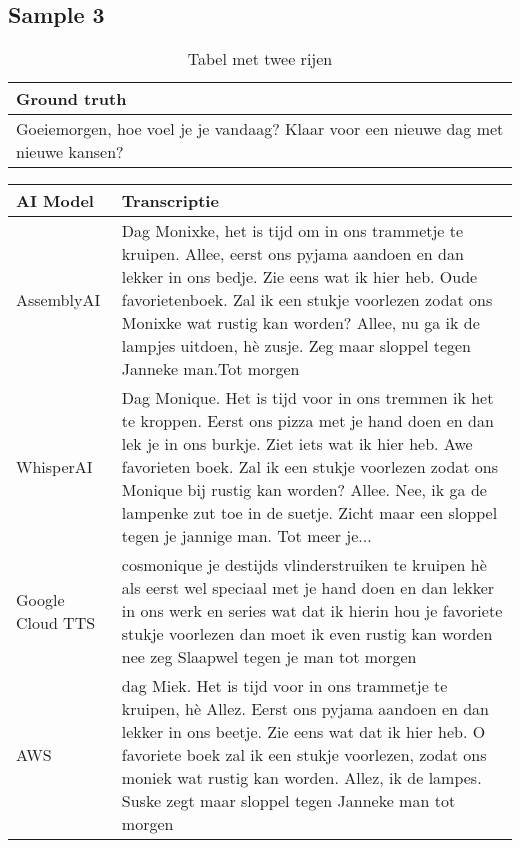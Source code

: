 \subsection{Sample 3}
\begin{table}[htbp]
    \centering
    \label{tab:groundtruth_sample3}
    \begin{tabularx}{\textwidth}{|X|}
        \hline
        \textbf{Ground truth} \\
        
        \hline
        Goeiemorgen, hoe voel je je vandaag? Klaar voor een nieuwe dag met nieuwe kansen? \\
        \hline
    \end{tabularx}
    \caption{Tabel met twee rijen}
\end{table}

\begin{table}[htbp]
    \centering
    \label{tab:results_sample3}
    \begin{tabularx}{\textwidth}{|l|X|}
    \hline
    \textbf{AI Model} & \textbf{Transcriptie} \\ \midrule
    
    AssemblyAI &    Dag Monixke, het is tijd om in ons trammetje te kruipen. Allee, eerst ons pyjama aandoen en dan lekker in ons bedje. Zie eens wat ik hier heb. Oude favorietenboek. Zal ik een stukje voorlezen zodat ons Monixke wat rustig kan worden? Allee, nu ga ik de lampjes uitdoen, hè zusje. Zeg maar sloppel tegen Janneke man.Tot morgen
    \\ \hline
    
    WhisperAI & Dag Monique. Het is tijd voor in ons tremmen ik het te kroppen. Eerst ons pizza met je hand doen en dan lek je in ons burkje. Ziet iets wat ik hier heb. Awe favorieten boek. Zal ik een stukje voorlezen zodat ons Monique bij rustig kan worden? Allee. Nee, ik ga de lampenke zut toe in de suetje. Zicht maar een sloppel tegen je jannige man. Tot meer je...
    \\ \hline
    
    Google Cloud TTS &         cosmonique je destijds vlinderstruiken te kruipen hè als eerst wel speciaal met je hand doen en dan lekker in ons werk en series wat dat ik hierin hou je favoriete stukje voorlezen dan moet ik even rustig kan worden nee zeg Slaapwel tegen je man tot morgen
    \\ \hline
    
    AWS &    dag Miek. Het is tijd voor in ons trammetje te kruipen, hè Allez. Eerst ons pyjama aandoen en dan lekker in ons beetje. Zie eens wat dat ik hier heb. O favoriete boek zal ik een stukje voorlezen, zodat ons moniek wat rustig kan worden. Allez, ik de lampes. Suske zegt maar sloppel tegen Janneke man tot morgen
    \\ \hline
    

\end{tabularx}
\end{table}
